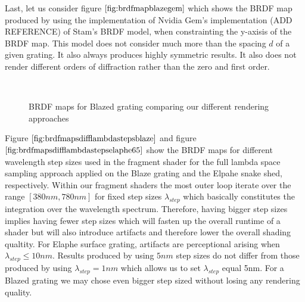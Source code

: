 Last, let us consider figure $\ref{fig:brdfmapblazegem}$ which shows the BRDF map produced by using the implementation of Nvidia Gem's implementation (ADD REFERENCE) of Stam's BRDF model, when constrainting the y-axisis of the BRDF map. This model does not consider much more than the spacing $d$ of a given grating. It also always produces highly symmetric results. It also does not render different orders of diffraction rather than the zero and first order.   

\begin{figure}[H]
  \centering
~
~
~
    
\caption[BRDF Map using our Approaches for Blazed Grating]{BRDF maps for Blazed grating comparing our different rendering approaches}
\label{fig:brdfmapsdiffrenderingapproaches}
\end{figure}

Figure $\ref{fig:brdfmapsdifflambdastepsblaze}$ and figure $\ref{fig:brdfmapsdifflambdastepselaphe65}$ show the BRDF maps for different wavelength step sizes used in the fragment shader for the full lambda space sampling approach applied on the Blaze grating and the Elpahe snake shed, respectively. Within our fragment shaders the most outer loop iterate over the range $[380nm, 780nm]$ for fixed step sizes $\lambda_{step}$ which basically constitutes the integration over the wavelength spectrum. Therefore, having bigger step sizes implies having fewer step sizes which will fasten up the overall runtime of a shader but will also introduce artifacts and therefore lower the overall shading qualtity. For Elaphe surface grating, artifacts are perceptional arising when $\lambda_{step} \leq 10nm$. Results produced by using $5nm$ step sizes do not differ from those produced by using $\lambda_{step}= 1nm$ which allows us to set $\lambda_{step}$ equal 5nm. For a Blazed grating we may chose even bigger step sized without losing any rendering quality.   

